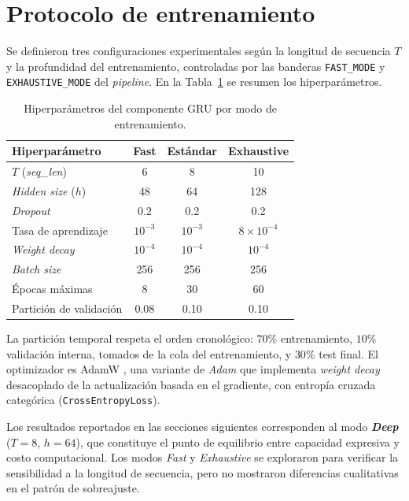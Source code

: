 
\section{Protocolo de entrenamiento}
\label{sec:app_gru_entrenamiento}

Se definieron tres configuraciones experimentales seg\'un la longitud de secuencia $T$ y la profundidad del entrenamiento, controladas por las banderas \texttt{FAST\_MODE} y \texttt{EXHAUSTIVE\_MODE} del \textit{pipeline}. En la Tabla~\ref{tab:gru_hiperparams} se resumen los hiperpar\'ametros.

\begin{table}[htbp]
	\centering
	\caption{Hiperpar\'ametros del componente GRU por modo de entrenamiento.}
	\label{tab:gru_hiperparams}
	\begin{tabular}{lccc}
		\toprule
		\textbf{Hiperpar\'ametro} & \textbf{Fast} & \textbf{Est\'andar} & \textbf{Exhaustive} \\
		\midrule
		$T$ (\emph{seq\_len}) & 6 & 8 & 10 \\
		\emph{Hidden size} ($h$) & 48 & 64 & 128 \\
		\emph{Dropout} & 0.2 & 0.2 & 0.2 \\
		Tasa de aprendizaje & $10^{-3}$ & $10^{-3}$ & $8\times10^{-4}$ \\
		\emph{Weight decay} & $10^{-4}$ & $10^{-4}$ & $10^{-4}$ \\
		\emph{Batch size} & 256 & 256 & 256 \\
		\'Epocas m\'aximas & 8 & 30 & 60 \\
		Partici\'on de validaci\'on & 0.08 & 0.10 & 0.10 \\
		\bottomrule
	\end{tabular}
\end{table}

La partici\'on temporal respeta el orden cronol\'ogico: $70\%$ entrenamiento, $10\%$ validaci\'on interna, tomados de la cola del entrenamiento, y $30\%$ test final. El optimizador es AdamW \cite{loshchilov2017adamw}, una variante de \textit{Adam} que implementa \textit{weight decay} desacoplado de la actualizaci\'on basada en el gradiente, con entrop\'ia cruzada categ\'orica (\texttt{CrossEntropyLoss}).

Los resultados reportados en las secciones siguientes corresponden al modo \textit{\textbf{Deep}} ($T=8$, $h=64$), que constituye el punto de equilibrio entre capacidad expresiva y costo computacional. Los modos \textit{Fast} y \textit{Exhaustive} se exploraron para verificar la sensibilidad a la longitud de secuencia, pero no mostraron diferencias cualitativas en el patr\'on de sobreajuste.

